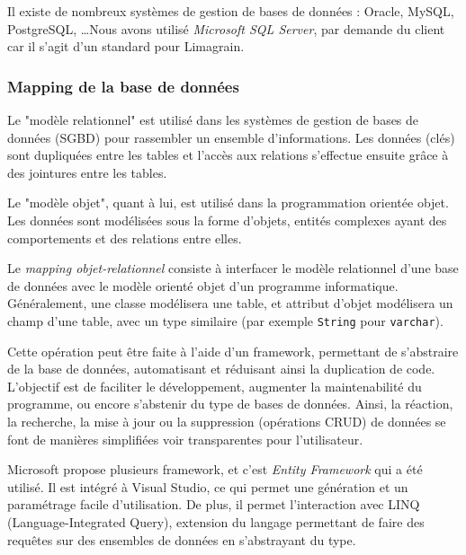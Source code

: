 Il existe de nombreux systèmes de gestion de bases de données : Oracle, MySQL, PostgreSQL, \ldots Nous avons utilisé \textit{Microsoft SQL Server}, par demande du client car il s'agit d'un standard pour Limagrain.


\subsubsection{Mapping de la base de données}


Le "modèle relationnel" est utilisé dans les systèmes de gestion de bases de données (SGBD) pour rassembler un ensemble d'informations.
Les données (clés) sont dupliquées entre les tables et l'accès aux relations s'effectue ensuite grâce à des jointures entre les tables.

Le "modèle objet", quant à lui, est utilisé dans la programmation orientée objet.
Les données sont modélisées sous la forme d'objets, entités complexes ayant des comportements et des relations entre elles.

Le \textit{mapping objet-relationnel} consiste à interfacer le modèle relationnel d'une base de données avec le modèle orienté objet d'un programme informatique.
Généralement, une classe modélisera une table, et attribut d'objet modélisera un champ d'une table, avec un type similaire (par exemple \lstinline{String} pour \lstinline{varchar}).



Cette opération peut être faite à l'aide d'un framework, permettant de s'abstraire de la base de données, automatisant et réduisant ainsi la duplication de code.
L'objectif est de faciliter le développement, augmenter la maintenabilité du programme, ou encore s'abstenir du type de bases de données.
Ainsi, la réaction, la recherche, la mise à jour ou la suppression (opérations CRUD) de données se font de manières simplifiées voir transparentes pour l'utilisateur.

Microsoft propose plusieurs framework, et c'est \textit{Entity Framework} qui a été utilisé.
Il est intégré à Visual Studio, ce qui permet une génération et un paramétrage facile d'utilisation.
De plus, il permet l'interaction avec  LINQ (Language-Integrated Query), extension du langage permettant de faire des requêtes sur des ensembles de données en s'abstrayant du type.

